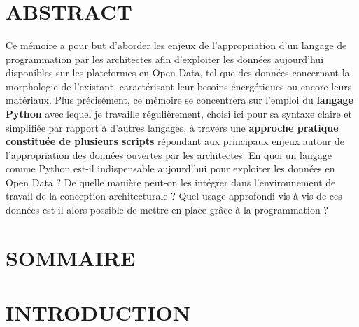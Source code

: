 \documentclass[
  11pt,
  french,
]{article}
\title{\headingfont\bfseries\singlespacing\LARGE\color{red}{Exploitation de l’Open Data avec Python par l’architecte}}
\subtitle{\normalfont\singlespacing\Large\color{red}{Démonstration par la pratique des apports potentiels au sein de la conception architecturale}}
\author{}
\date{\vspace{-2.5em}}
\begin{document}
\maketitle

\newpage

\hypertarget{abstract}{%
\section*{ABSTRACT}\label{abstract}}

Ce mémoire a pour but d'aborder les enjeux de l'appropriation d'un
langage de programmation par les architectes afin d'exploiter les
données aujourd'hui disponibles sur les plateformes en Open Data, tel
que des données concernant la morphologie de l'existant, caractérisant
leur besoins énergétiques ou encore leurs matériaux. Plus précisément,
ce mémoire se concentrera sur l'emploi du \textbf{langage Python} avec
lequel je travaille régulièrement, choisi ici pour sa syntaxe claire et
simplifiée par rapport à d'autres langages, à travers une
\textbf{approche pratique constituée de plusieurs scripts} répondant aux
principaux enjeux autour de l'appropriation des données ouvertes par les
architectes. En quoi un langage comme Python est-il indispensable
aujourd'hui pour exploiter les données en Open Data ? De quelle manière
peut-on les intégrer dans l'environnement de travail de la conception
architecturale ? Quel usage approfondi vis à vis de ces données est-il
alors possible de mettre en place grâce à la programmation ?

\newpage

\hypertarget{sommaire}{%
\section*{SOMMAIRE}\label{sommaire}}

\renewcommand{\contentsname}{}
\tableofcontents

\newpage

\hypertarget{introduction}{%
\section*{INTRODUCTION}\label{introduction}}
\end{document}
